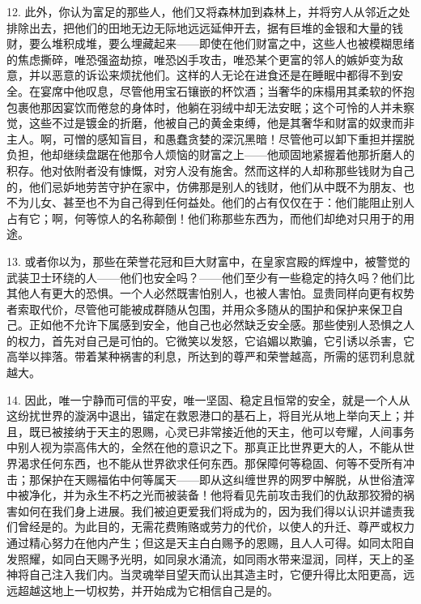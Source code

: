 12. 此外，你认为富足的那些人，他们又将森林加到森林上，并将穷人从邻近之处排除出去，把他们的田地无边无际地远远延伸开去，据有巨堆的金银和大量的钱财，要么堆积成堆，要么埋藏起来——即使在他们财富之中，这些人也被模糊思绪的焦虑撕碎，唯恐强盗劫掠，唯恐凶手攻击，唯恐某个更富的邻人的嫉妒变为敌意，并以恶意的诉讼来烦扰他们。这样的人无论在进食还是在睡眠中都得不到安全。在宴席中他叹息，尽管他用宝石镶嵌的杯饮酒；当奢华的床榻用其柔软的怀抱包裹他那因宴饮而倦怠的身体时，他躺在羽绒中却无法安眠；这个可怜的人并未察觉，这些不过是镀金的折磨，他被自己的黄金束缚，他是其奢华和财富的奴隶而非主人。啊，可憎的感知盲目，和愚蠢贪婪的深沉黑暗！尽管他可以卸下重担并摆脱负担，他却继续盘踞在他那令人烦恼的财富之上——他顽固地紧握着他那折磨人的积存。他对依附者没有慷慨，对穷人没有施舍。然而这样的人却称那些钱财为自己的，他们忌妒地劳苦守护在家中，仿佛那是别人的钱财，他们从中既不为朋友、也不为儿女、甚至也不为自己得到任何益处。他们的占有仅仅在于：他们能阻止别人占有它；啊，何等惊人的名称颠倒！他们称那些东西为，而他们却绝对只用于的用途。\par

13. 或者你以为，那些在荣誉花冠和巨大财富中，在皇家宫殿的辉煌中，被警觉的武装卫士环绕的人——他们也安全吗？——他们至少有一些稳定的持久吗？他们比其他人有更大的恐惧。一个人必然既害怕别人，也被人害怕。显贵同样向更有权势者索取代价，尽管他可能被成群随从包围，并用众多随从的围护和保护来保卫自己。正如他不允许下属感到安全，他自己也必然缺乏安全感。那些使别人恐惧之人的权力，首先对自己是可怕的。它微笑以发怒，它谄媚以欺骗，它引诱以杀害，它高举以摔落。带着某种祸害的利息，所达到的尊严和荣誉越高，所需的惩罚利息就越大。\par

14. 因此，唯一宁静而可信的平安，唯一坚固、稳定且恒常的安全，就是一个人从这纷扰世界的漩涡中退出，锚定在救恩港口的基石上，将目光从地上举向天上；并且，既已被接纳于天主的恩赐，心灵已非常接近他的天主，他可以夸耀，人间事务中别人视为崇高伟大的，全然在他的意识之下。那真正比世界更大的人，不能从世界渴求任何东西，也不能从世界欲求任何东西。那保障何等稳固、何等不受所有冲击；那保护在天赐福佑中何等属天——即从这纠缠世界的网罗中解脱，从世俗渣滓中被净化，并为永生不朽之光而被装备！他将看见先前攻击我们的仇敌那狡猾的祸害如何在我们身上进展。我们被迫更爱我们将成为的，因为我们得以认识并谴责我们曾经是的。为此目的，无需花费贿赂或劳力的代价，以使人的升迁、尊严或权力通过精心努力在他内产生；但这是天主白白赐予的恩赐，且人人可得。如同太阳自发照耀，如同白天赐予光明，如同泉水涌流，如同雨水带来湿润，同样，天上的圣神将自己注入我们内。当灵魂举目望天而认出其造主时，它便升得比太阳更高，远远超越这地上一切权势，并开始成为它相信自己是的。\par

